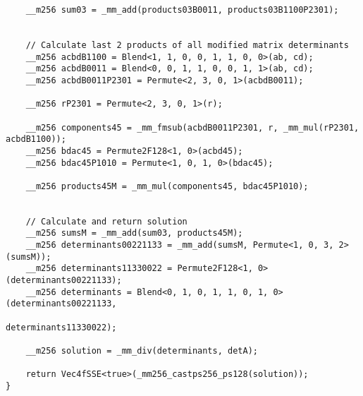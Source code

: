 \begin{verbatim}
    __m256 sum03 = _mm_add(products03B0011, products03B1100P2301);


    // Calculate last 2 products of all modified matrix determinants
    __m256 acbdB1100 = Blend<1, 1, 0, 0, 1, 1, 0, 0>(ab, cd);
    __m256 acbdB0011 = Blend<0, 0, 1, 1, 0, 0, 1, 1>(ab, cd);
    __m256 acbdB0011P2301 = Permute<2, 3, 0, 1>(acbdB0011);

    __m256 rP2301 = Permute<2, 3, 0, 1>(r);

    __m256 components45 = _mm_fmsub(acbdB0011P2301, r, _mm_mul(rP2301, acbdB1100));
    __m256 bdac45 = Permute2F128<1, 0>(acbd45);
    __m256 bdac45P1010 = Permute<1, 0, 1, 0>(bdac45);

    __m256 products45M = _mm_mul(components45, bdac45P1010);


    // Calculate and return solution
    __m256 sumsM = _mm_add(sum03, products45M);
    __m256 determinants00221133 = _mm_add(sumsM, Permute<1, 0, 3, 2>(sumsM));
    __m256 determinants11330022 = Permute2F128<1, 0>(determinants00221133);
    __m256 determinants = Blend<0, 1, 0, 1, 1, 0, 1, 0>(determinants00221133, 
                                                        determinants11330022);

    __m256 solution = _mm_div(determinants, detA);

    return Vec4fSSE<true>(_mm256_castps256_ps128(solution));
}
\end{verbatim}